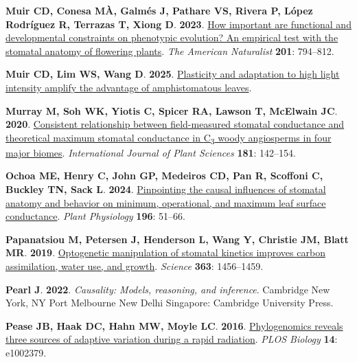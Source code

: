 \documentclass[
  letterpaper,
  DIV=11,
  numbers=noendperiod]{scrartcl}
\newlength{\cslhangindent}
\newenvironment{CSLReferences}[2] %
 {\begin{list}{}{%
  \setlength{\itemindent}{0pt}
  \setlength{\leftmargin}{0pt}
  \setlength{\parsep}{0pt}
  \ifodd #1
   \setlength{\leftmargin}{\cslhangindent}
   \setlength{\itemindent}{-1\cslhangindent}
  \fi
  \setlength{\itemsep}{#2\baselineskip}}}
 {\end{list}}
\begin{document}
\begin{CSLReferences}{0}{1}
\textbf{\textbf{Muir CD}, \textbf{Conesa MÀ}, \textbf{Galmés J},
\textbf{Pathare VS}, \textbf{Rivera P}, \textbf{López Rodríguez R},
\textbf{Terrazas T}, \textbf{Xiong D}}. \textbf{2023}.
\href{https://doi.org/10.1086/723780}{How important are functional and
developmental constraints on phenotypic evolution? {An} empirical test
with the stomatal anatomy of flowering plants}. \emph{The American
Naturalist} \textbf{201}: 794--812.

\textbf{\textbf{Muir CD}, \textbf{Lim WS}, \textbf{Wang D}}.
\textbf{2025}.
\href{https://doi.org/10.1101/2025.08.19.671015}{Plasticity and
adaptation to high light intensity amplify the advantage of
amphistomatous leaves}.

\textbf{\textbf{Murray M}, \textbf{Soh WK}, \textbf{Yiotis C},
\textbf{Spicer RA}, \textbf{Lawson T}, \textbf{McElwain JC}}.
\textbf{2020}. \href{https://doi.org/10.1086/706260}{Consistent
relationship between field-measured stomatal conductance and theoretical
maximum stomatal conductance in {C}{\textsubscript{3}} woody angiosperms
in four major biomes}. \emph{International Journal of Plant Sciences}
\textbf{181}: 142--154.

\textbf{\textbf{Ochoa ME}, \textbf{Henry C}, \textbf{John GP},
\textbf{Medeiros CD}, \textbf{Pan R}, \textbf{Scoffoni C},
\textbf{Buckley TN}, \textbf{Sack L}}. \textbf{2024}.
\href{https://doi.org/10.1093/plphys/kiae292}{Pinpointing the causal
influences of stomatal anatomy and behavior on minimum, operational, and
maximum leaf surface conductance}. \emph{Plant Physiology} \textbf{196}:
51--66.

\textbf{\textbf{Papanatsiou M}, \textbf{Petersen J}, \textbf{Henderson
L}, \textbf{Wang Y}, \textbf{Christie JM}, \textbf{Blatt MR}}.
\textbf{2019}.
\href{https://doi.org/10.1126/science.aaw0046}{Optogenetic manipulation
of stomatal kinetics improves carbon assimilation, water use, and
growth}. \emph{Science} \textbf{363}: 1456--1459.

\textbf{\textbf{Pearl J}}. \textbf{2022}. \emph{Causality: Models,
reasoning, and inference}. Cambridge New York, NY Port Melbourne New
Delhi Singapore: Cambridge University Press.

\textbf{\textbf{Pease JB}, \textbf{Haak DC}, \textbf{Hahn MW},
\textbf{Moyle LC}}. \textbf{2016}.
\href{https://doi.org/10.1371/journal.pbio.1002379}{Phylogenomics
reveals three sources of adaptive variation during a rapid radiation}.
\emph{PLOS Biology} \textbf{14}: e1002379.


\end{CSLReferences}
\end{document}
